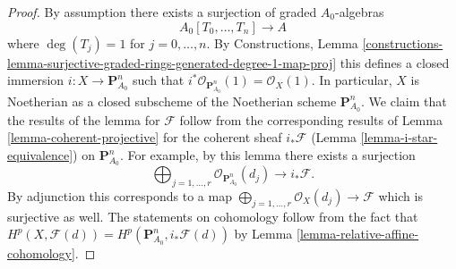 \begin{proof}
By assumption there exists a surjection of graded $A_0$-algebras
$$
A_0[T_0, \ldots, T_n] \longrightarrow A
$$
where $\deg(T_j) = 1$ for $j = 0, \ldots, n$. By Constructions, Lemma
\ref{constructions-lemma-surjective-graded-rings-generated-degree-1-map-proj}
this defines a closed immersion $i : X \to \mathbf{P}^n_{A_0}$
such that $i^*\mathcal{O}_{\mathbf{P}^n_{A_0}}(1) = \mathcal{O}_X(1)$.
In particular, $X$ is Noetherian as a closed subscheme of the Noetherian
scheme $\mathbf{P}^n_{A_0}$. We claim that the results of the lemma for
$\mathcal{F}$ follow from the corresponding
results of Lemma \ref{lemma-coherent-projective} for the coherent sheaf
$i_*\mathcal{F}$ (Lemma \ref{lemma-i-star-equivalence}) on
$\mathbf{P}^n_{A_0}$. For example, by this lemma there
exists a surjection
$$
\bigoplus\nolimits_{j = 1, \ldots, r} \mathcal{O}_{\mathbf{P}^n_{A_0}}(d_j)
\longrightarrow i_*\mathcal{F}.
$$
By adjunction this corresponds to a map
$\bigoplus_{j = 1, \ldots, r} \mathcal{O}_X(d_j) \longrightarrow \mathcal{F}$
which is surjective as well. The statements on cohomology follow from the
fact that
$H^p(X, \mathcal{F}(d)) = H^p(\mathbf{P}^n_{A_0}, i_*\mathcal{F}(d))$
by Lemma \ref{lemma-relative-affine-cohomology}.
\end{proof}

